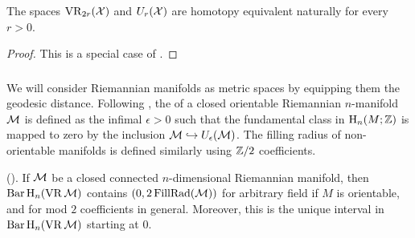 \medskip\lemma The spaces $\operatorname{VR}_{2r}(\mathcal{X})$ and $U_r(\mathcal{X})$ are homotopy equivalent naturally for every \(r > 0\).

\begin{proof}
	This is a special case of \cite[Theorem.4.1]{lim2020vietoris}.
\end{proof}

\subsubsection{}\label{ss:filling_radius}

We will consider Riemannian manifolds as metric spaces by equipping them the geodesic distance.
Following \cite{gromov1983filling}, the  of a closed orientable Riemannian $n$-manifold $\mathcal{M}$ is defined as the infimal $\epsilon > 0$ such that the fundamental class in $\mathrm{H}_n(M; \mathbb{Z})$ is mapped to zero by the inclusion $\mathcal{M} \hookrightarrow U_\epsilon(\mathcal{M})$.
The filling radius of non-orientable manifolds is defined similarly using \(\mathbb{Z}/2\) coefficients.

\medskip\lemma(\cite[Prop.9.28]{lim2020vietoris}). If $\mathcal{M}$ be a closed connected $n$-dimensional Riemannian manifold, then \(\operatorname{Bar} \operatorname{H}_{n}(\operatorname{VR} \mathcal{M})\) contains \((0,2\operatorname{FillRad}(\mathcal{M}))\) for arbitrary field if $M$ is orientable, and for mod $2$ coefficients in general.
Moreover, this is the unique interval in \(\operatorname{Bar} \operatorname{H}_{n}(\operatorname{VR} \mathcal{M})\) starting at $0$.